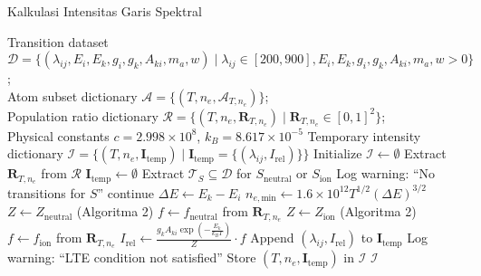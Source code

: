 \label{app:algo3}
\begin{algoritma}[H]
\small
\caption{Kalkulasi Intensitas Garis Spektral}
\begin{algorithmic}[1]
  \REQUIRE Transition dataset $\mathcal{D} = \{ (\lambda_{ij}, E_i, E_k, g_i, g_k, A_{ki}, m_a, w) \mid \lambda_{ij} \in [200, 900], E_i, E_k, g_i, g_k, A_{ki}, m_a, w > 0 \}$; \\ Atom subset dictionary $\mathcal{A} = \{ (T, n_e, \mathcal{A}_{T,n_e}) \}$; \\ Population ratio dictionary $\mathcal{R} = \{ (T, n_e, \mathbf{R}_{T,n_e}) \mid \mathbf{R}_{T,n_e} \in [0, 1]^2 \}$; \\ Physical constants $c = 2.998 \times 10^8$, $k_B = 8.617 \times 10^{-5}$
  \ENSURE Temporary intensity dictionary $\mathcal{I} = \{ (T, n_e, \mathbf{I}_{\text{temp}}) \mid \mathbf{I}_{\text{temp}} = \{ (\lambda_{ij}, I_{\text{rel}}) \} \}$
  \STATE Initialize $\mathcal{I} \gets \emptyset$ 
    \STATE Extract $\mathbf{R}_{T,n_e}$ from $\mathcal{R}$ 
    \STATE $\mathbf{I}_{\text{temp}} \gets \emptyset$ 
      \STATE Extract $\mathcal{T}_S \subseteq \mathcal{D}$ for $S_{\text{neutral}}$ or $S_{\text{ion}}$ 
        \STATE Log warning: ``No transitions for $S$'' 
        \STATE continue
      \ENDIF
        \STATE $\Delta E \gets E_k - E_i$ 
        \STATE $n_{e,\text{min}} \gets 1.6 \times 10^{12} T^{1/2} (\Delta E)^{3/2}$ 
            \STATE $Z \gets Z_{\text{neutral}}$ (Algoritma 2) 
            \STATE $f \gets f_{\text{neutral}}$ from $\mathbf{R}_{T,n_e}$ 
          \ELSE
            \STATE $Z \gets Z_{\text{ion}}$ (Algoritma 2) 
            \STATE $f \gets f_{\text{ion}}$ from $\mathbf{R}_{T,n_e}$ 
          \ENDIF
          \STATE $I_{\text{rel}} \gets \frac{g_k A_{ki} \exp\left(-\frac{E_k}{k_B T}\right)}{Z} \cdot f$ 
          \STATE Append $(\lambda_{ij}, I_{\text{rel}})$ to $\mathbf{I}_{\text{temp}}$ 
        \ELSE
          \STATE Log warning: ``LTE condition not satisfied'' 
        \ENDIF
      \ENDFOR
    \ENDFOR
    \STATE Store $(T, n_e, \mathbf{I}_{\text{temp}})$ in $\mathcal{I}$ 
  \ENDFOR
  \RETURN $\mathcal{I}$ 
\end{algorithmic}
\end{algoritma}

